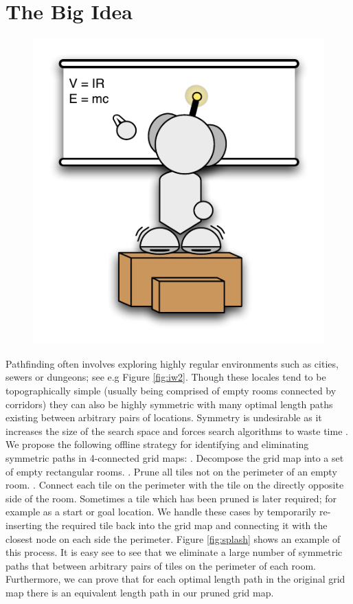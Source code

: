 \section{The Big Idea}
 \begin{figure}
	\vspace{-3.5em}
		\includegraphics[width=0.25\columnwidth, trim=10mm 10mm 10mm 10mm]{diagrams/robot_whiteboard.pdf}
 	\vspace{-3.5em}
 \end{figure}
Pathfinding often involves exploring highly regular 
environments such as cities, sewers or dungeons; see e.g Figure \ref{fig:iw2}.
Though these locales tend to be topographically simple (usually being comprised
of empty rooms connected by corridors) they can also be highly symmetric 
with many optimal length paths existing between arbitrary pairs of locations.
Symmetry is undesirable as it increases the size of the search space and forces
search algorithms to waste time \cite{walsh07}.
\newline \newline
We propose the following offline strategy for identifying and eliminating symmetric paths in 
4-connected grid maps:
\newline {}. Decompose the grid map into a set of empty rectangular rooms.
. Prune all tiles not on the perimeter of an empty room.
. Connect each tile on the perimeter with the tile on the directly opposite side of the room.
\newline \newline
Sometimes a tile which has been pruned is later required; for example as a start
or goal location. 
We handle these cases by temporarily re-inserting the required tile back into
the grid map and connecting it with the closest node on each side the perimeter.
\newline \newline
Figure \ref{fig:splash} shows an example of this process.
It is easy see to see that we eliminate a large number of symmetric paths
that between arbitrary pairs of tiles on the perimeter of each room. 
Furthermore, we can prove that for each optimal length path in the
original grid map there is an equivalent length path in our pruned grid map.
